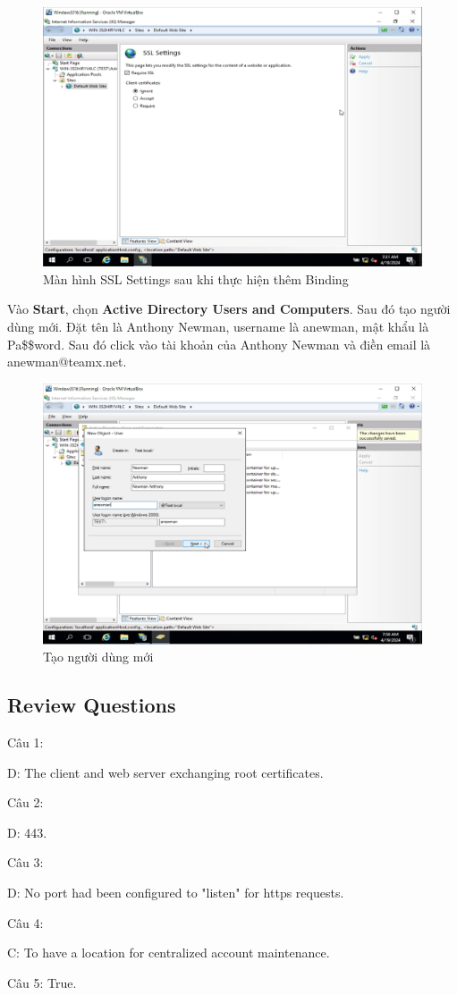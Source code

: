 \begin{figure}[!htb]
    \centering
    \includegraphics[width=0.9\linewidth]{figure//chapter4//lab4_2/ssl_setting_after_bind.png}
    \caption{Màn hình SSL Settings sau khi thực hiện thêm Binding}
    \label{fig:enter-label}
\end{figure}

 Vào \textbf{Start}, chọn \textbf{Active Directory Users and Computers}. Sau đó tạo người dùng mới. Đặt tên là Anthony Newman, username là anewman, mật khẩu là Pa\$\$word. Sau đó click vào tài khoản của Anthony Newman và điền email là anewman@teamx.net. 

\begin{figure}[!htb]
    \centering
    \includegraphics[width=0.8\linewidth]{figure//chapter4//lab4_2/create_account.png}
    \caption{Tạo người dùng mới}
    \label{fig:enter-label}
\end{figure}

\subsection{Review Questions}

\noindent Câu 1: 

D: The client and web server exchanging root certificates.

\noindent Câu 2: 

D: 443.

\noindent Câu 3: 

D: No port had been configured to "listen" for https requests.

\noindent Câu 4: 

C: To have a location for centralized account maintenance.

\noindent Câu 5: True.